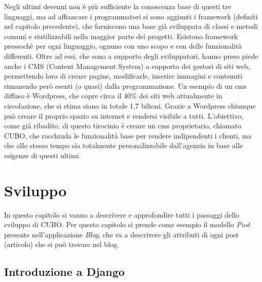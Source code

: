 \documentclass[12pt,a4paper]{article}
\begin{document}
Negli ultimi decenni non è più sufficiente la conoscenza base di questi tre linguaggi, ma ad affiancare i programmatori si sono aggiunti i framework (definiti nel capitolo precedente), che forniscono una base già sviluppata di classi e metodi comuni e riutilizzabili nella maggior parte dei progetti. Esistono framework pressochè per ogni linguaggio, ognuno con uno scopo e con delle funzionalità differenti.
Oltre ad essi, che sono a supporto degli sviluppatori, hanno preso piede anche i CMS (Content Management System) a supporto dei	gestori di siti web, permettendo loro di creare pagine, modificarle, inserire immagini e contenuti rimanendo però esenti (o quasi) dalla programmazione.
Un esempio di un cms diffuso è Wordpress, che copre circa il 40\% dei siti web attualmente in circolazione, che si stima siano in totale 1,7 bilioni.
Grazie a Wordpress chiunque può creare il proprio spazio su internet e rendersi visibile a tutti.
L’obiettivo, come già ribadito, di questo tirocinio è creare un cms proprietario, chiamato CUBO, che racchiuda le funzionalità base per rendere indipendenti i clienti, ma che allo stesso tempo sia totalmente personalizzabile dall’agenzia in base alle esigenze di questi ultimi.
\clearpage
\section{Sviluppo}
In questo capitolo si vanno a descrivere e approfondire tutti i passaggi dello sviluppo di CUBO.
Per questo capitolo si prende come esempio il modello \textit{Post} presente nell’applicazione \textit{Blog}, che va a descrivere gli attributi di ogni post (articolo) che si può trovare nel blog.

\subsection{Introduzione a Django}
\end{document}
